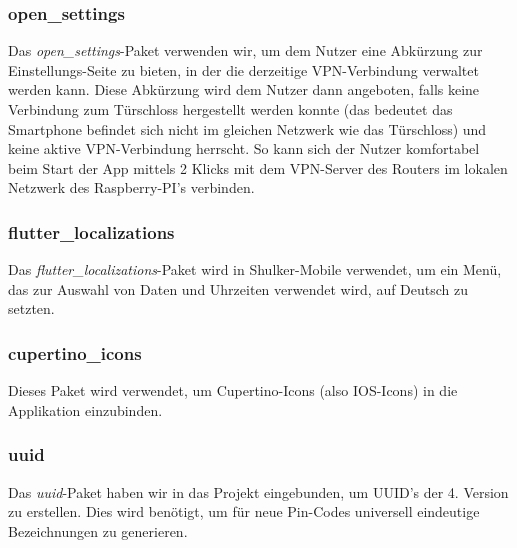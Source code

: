 \subsubsection{open\_settings}
Das \textit{open\_settings}-Paket verwenden wir, um dem Nutzer eine Abkürzung zur Einstellungs-Seite zu bieten, 
in der die derzeitige VPN-Verbindung verwaltet werden kann. Diese Abkürzung wird dem Nutzer dann angeboten, falls 
keine Verbindung zum Türschloss hergestellt werden konnte (das bedeutet das Smartphone befindet sich nicht im gleichen
Netzwerk wie das Türschloss) und keine aktive VPN-Verbindung herrscht. So kann sich der Nutzer komfortabel beim Start
der App mittels 2 Klicks mit dem VPN-Server des Routers im lokalen Netzwerk des Raspberry-PI's verbinden. 

\subsubsection{flutter\_localizations}
Das \textit{flutter\_localizations}-Paket wird in Shulker-Mobile verwendet, um ein Menü, das zur Auswahl von
Daten und Uhrzeiten verwendet wird, auf Deutsch zu setzten.  

\subsubsection{cupertino\_icons}
Dieses Paket wird verwendet, um Cupertino-Icons (also IOS-Icons) in die Applikation einzubinden.

\subsubsection{uuid}
Das \textit{uuid}-Paket haben wir in das Projekt eingebunden, um UUID's der 4. Version zu erstellen.
Dies wird benötigt, um für neue Pin-Codes universell eindeutige Bezeichnungen zu generieren.